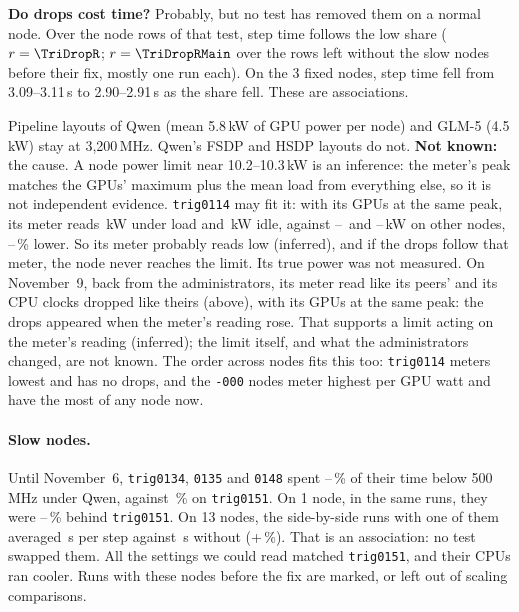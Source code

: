 \textbf{Do drops cost time?} Probably, but no test has removed them on a normal node. Over the \TriDropRows{} node rows of that test, step time follows the low share ($r=\TriDropR$; $r=\TriDropRMain$ over the \TriDropRMainRows{} rows left without the slow nodes before their fix, mostly one run each). On the 3 fixed nodes, step time fell from 3.09--3.11\,s to 2.90--2.91\,s as the share fell. These are associations.

Pipeline layouts of Qwen (mean 5.8\,kW of GPU power per node) and GLM-5 (4.5\,kW) stay at 3,200\,MHz. Qwen's FSDP and HSDP layouts do not.
\textbf{Not known:} the cause. A node power limit near 10.2--10.3\,kW is an inference: the meter's peak matches the GPUs' maximum plus the mean load from everything else, so it is not independent evidence. \texttt{trig0114} may fit it: with its GPUs at the same peak, its meter reads \TriMeterOddPeak\,kW under load and \TriMeterOddIdle\,kW idle, against \TriMeterPeakLo--\TriMeterPeakHi\ and \TriMeterIdleLo--\TriMeterIdleHi\,kW on \TriAllNodes{} other nodes, \TriMeterOddPct--\TriMeterOddIdlePct\,\% lower. So its meter probably reads low (inferred), and if the drops follow that meter, the node never reaches the limit. Its true power was not measured. On November~9, back from the administrators, its meter read like its peers' and its CPU clocks dropped like theirs (above), with its GPUs at the same peak: the drops appeared when the meter's reading rose. That supports a limit acting on the meter's reading (inferred); the limit itself, and what the administrators changed, are not known. The order across nodes fits this too: \texttt{trig0114} meters lowest and has no drops, and the \texttt{-000} nodes meter highest per GPU watt and have the most of any node now.

\paragraph{Slow nodes.} Until November~6, \texttt{trig0134}, \texttt{0135} and \texttt{0148} spent \TriProbeSlowTimeLo--\TriProbeSlowTimeHi\,\% of their time below 500\,MHz under Qwen, against \TriProbeRefTime\,\% on \texttt{trig0151}. On 1 node, in the same runs, they were \TriSlowBehindLo--\TriSlowBehindHi\,\% behind \texttt{trig0151}. On 13 nodes, the side-by-side runs with one of them
averaged \TriSlowThirteenWith\,s per step against \TriSlowThirteenWithout\,s without (+\TriSlowThirteenPct\,\%). That is an association: no test swapped them. All the settings we could read matched \texttt{trig0151}, and their CPUs ran cooler. Runs with these nodes before the fix are marked, or left out of scaling comparisons.

